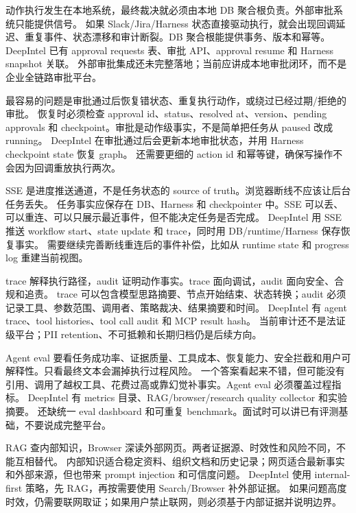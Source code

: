 {动作执行发生在本地系统，最终裁决就必须由本地 DB 聚合根负责。外部审批系统只能提供信号。}
{如果 Slack/Jira/Harness 状态直接驱动执行，就会出现回调延迟、重复事件、状态漂移和审计断裂。DB 聚合根能提供事务、版本和幂等。}
{DeepIntel 已有 approval requests 表、审批 API、approval resume 和 Harness snapshot 关联。}
{外部审批集成还未完整落地；当前应讲成本地审批闭环，而不是企业全链路审批平台。}

{最容易的问题是审批通过后恢复错状态、重复执行动作，或绕过已经过期/拒绝的审批。}
{恢复时必须检查 approval id、status、resolved at、version、pending approvals 和 checkpoint。审批是动作级事实，不是简单把任务从 paused 改成 running。}
{DeepIntel 在审批通过后会更新本地审批状态，并用 Harness checkpoint state 恢复 graph。}
{还需要更细的 action id 和幂等键，确保写操作不会因为回调重放执行两次。}

{SSE 是进度推送通道，不是任务状态的 source of truth。浏览器断线不应该让后台任务丢失。}
{任务事实应保存在 DB、Harness 和 checkpointer 中。SSE 可以丢、可以重连、可以只展示最近事件，但不能决定任务是否完成。}
{DeepIntel 用 SSE 推送 workflow start、state update 和 trace，同时用 DB/runtime/Harness 保存恢复事实。}
{需要继续完善断线重连后的事件补偿，比如从 runtime state 和 progress log 重建当前视图。}

{trace 解释执行路径，audit 证明动作事实。trace 面向调试，audit 面向安全、合规和追责。}
{trace 可以包含模型思路摘要、节点开始结束、状态转换；audit 必须记录工具、参数范围、调用者、策略裁决、结果摘要和时间。}
{DeepIntel 有 agent trace、tool histories、tool call audit 和 MCP result hash。}
{当前审计还不是法证级平台；PII retention、不可抵赖和长期归档仍是后续方向。}

{Agent eval 要看任务成功率、证据质量、工具成本、恢复能力、安全拦截和用户可解释性。只看最终文本会漏掉执行过程风险。}
{一个答案看起来不错，但可能没有引用、调用了越权工具、花费过高或靠幻觉补事实。Agent eval 必须覆盖过程指标。}
{DeepIntel 有 metrics 目录、RAG/browser/research quality collector 和实验摘要。}
{还缺统一 eval dashboard 和可重复 benchmark。面试时可以讲已有评测基础，不要说成完整平台。}

{RAG 查内部知识，Browser 深读外部网页。两者证据源、时效性和风险不同，不能互相替代。}
{内部知识适合稳定资料、组织文档和历史记录；网页适合最新事实和外部来源，但也带来 prompt injection 和可信度问题。}
{DeepIntel 使用 internal-first 策略，先 RAG，再按需要使用 Search/Browser 补外部证据。}
{如果问题高度时效，仍需要联网取证；如果用户禁止联网，则必须基于内部证据并说明边界。}

